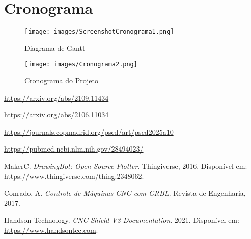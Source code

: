 \documentclass[a4paper,12pt]{article}
\begin{document}
\vspace{1em}

\section{Cronograma}
\begin{figure}[H]
    \centering
    \texttt{[image: images/ScreenshotCronograma1.png]} %
    \caption{Diagrama de Gantt}
    \label{fig:cronograma_gantt}
\end{figure}

\vspace{1em}

\begin{figure}[H]
    \centering
    \texttt{[image: images/Cronograma2.png]} %
    \caption{Cronograma do Projeto}
    \label{fig:cronograma_projeto}
\end{figure}

\vspace{1em}

\begin{thebibliography}{9}
 \href{https://arxiv.org/abs/2109.11434}{https://arxiv.org/abs/2109.11434}

 \href{https://arxiv.org/abs/2106.11034}{https://arxiv.org/abs/2106.11034}

 \href{https://journals.copmadrid.org/psed/art/psed2025a10}{https://journals.copmadrid.org/psed/art/psed2025a10}

 \href{https://pubmed.ncbi.nlm.nih.gov/28494023/}{https://pubmed.ncbi.nlm.nih.gov/28494023/}

 MakerC. \textit{DrawingBot: Open Source Plotter}. Thingiverse, 2016. Disponível em: \url{https://www.thingiverse.com/thing:2348062}.

 Conrado, A. \textit{Controle de Máquinas CNC com GRBL}. Revista de Engenharia, 2017.

 Handson Technology. \textit{CNC Shield V3 Documentation}. 2021. Disponível em: \url{https://www.handsontec.com}.

\end{thebibliography}
\end{document}
